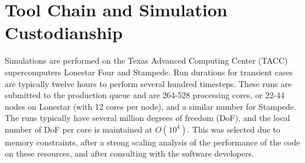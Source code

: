 

\section{Tool Chain and Simulation Custodianship}

Simulations are performed on the Texas Advanced Computing Center (TACC)
supercomputers Lonestar Four and Stampede. Run durations for transient
cases are typically twelve hours to perform several hundred timesteps. 
These runs are submitted to the production queue and are  
264-528 processing cores, 
or 22-44 nodes on Lonestar (with 12 cores per node), and a similar number
for Stampede. The runs typically have several million degrees of freedom (DoF), 
and the local number of DoF per core is maintained at $O(10^4)$. This was
selected due to memory constraints, after a strong scaling
analysis of the performance of the code on these resources, and
after consulting with the software developers.  

